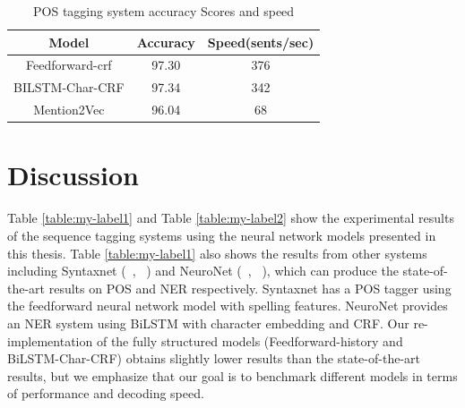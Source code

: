 \documentclass{sfuthesis}
\begin{document}
\begin{table}[]
\centering
\caption{POS tagging system accuracy Scores and speed}
\label{table:pos-mention2vec}
\begin{tabular}{|c|c|c|}
\hline
Model            & Accuracy     & Speed(sents/sec)        \\ \hline
Feedforward-crf  & 97.30  & 376                     \\ \hline
BILSTM-Char-CRF & 97.34  & 342                    \\ \hline
Mention2Vec      & 96.04  & 68                    \\ \hline
\end{tabular}
\end{table}



\chapter{Discussion}

Table \ref{table:my-label1} and Table \ref{table:my-label2} show the experimental results of the sequence tagging systems using the neural network models presented in this thesis. Table \ref{table:my-label1} also shows the results from other systems including Syntaxnet (~\citeauthor{alberti2017syntaxnet}, ~\citeyear{alberti2017syntaxnet}) and NeuroNet (~\citeauthor{2017neuroner}, ~\citeyear{2017neuroner}), which can produce the state-of-the-art results on POS and NER respectively. Syntaxnet has a POS tagger using the feedforward neural network model with spelling features. NeuroNet provides an NER system using BiLSTM with character embedding and CRF. Our re-implementation of the fully structured models (Feedforward-history and BiLSTM-Char-CRF) obtains slightly lower results than the state-of-the-art results, but we emphasize that our goal is to benchmark different models in terms of performance and decoding speed.
\end{document}
